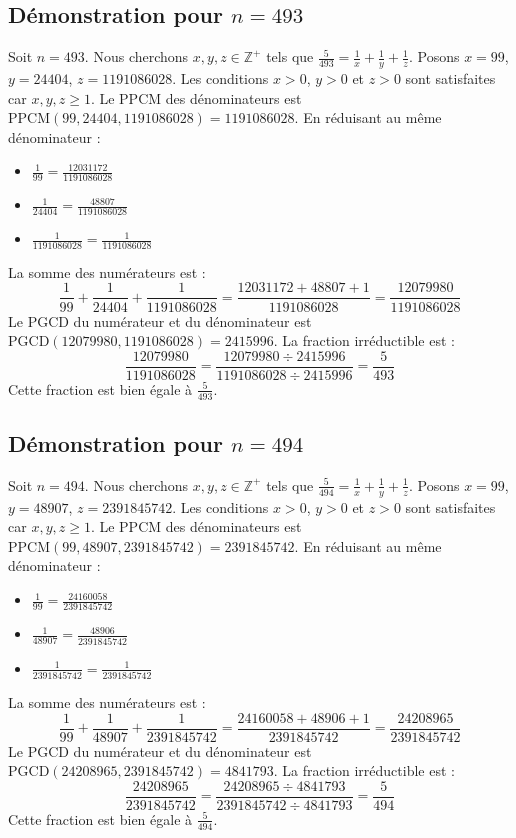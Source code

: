 \documentclass[11pt,a4paper]{article}
\begin{document}
\subsection{Démonstration pour $n = 493$}
Soit $n = 493$. Nous cherchons $x, y, z \in \mathbb{Z}^{+}$ tels que $\frac{5}{493} = \frac{1}{x} + \frac{1}{y} + \frac{1}{z}$.
Posons $x = 99$, $y = 24404$, $z = 1191086028$.
Les conditions $x > 0$, $y > 0$ et $z > 0$ sont satisfaites car $x, y, z \geq 1$.
Le PPCM des dénominateurs est $\text{PPCM}(99, 24404, 1191086028) = 1191086028$.
En réduisant au même dénominateur :
\begin{itemize}
    \item $\frac{1}{99} = \frac{12031172}{1191086028}$
    \item $\frac{1}{24404} = \frac{48807}{1191086028}$
    \item $\frac{1}{1191086028} = \frac{1}{1191086028}$
\end{itemize}
La somme des numérateurs est :
$$ \frac{1}{99} + \frac{1}{24404} + \frac{1}{1191086028} = \frac{12031172 + 48807 + 1}{1191086028} = \frac{12079980}{1191086028} $$
Le PGCD du numérateur et du dénominateur est $\text{PGCD}(12079980, 1191086028) = 2415996$.
La fraction irréductible est :
$$ \frac{12079980}{1191086028} = \frac{12079980 \div 2415996}{1191086028 \div 2415996} = \frac{5}{493} $$
Cette fraction est bien égale à $\frac{5}{493}$.

\subsection{Démonstration pour $n = 494$}
Soit $n = 494$. Nous cherchons $x, y, z \in \mathbb{Z}^{+}$ tels que $\frac{5}{494} = \frac{1}{x} + \frac{1}{y} + \frac{1}{z}$.
Posons $x = 99$, $y = 48907$, $z = 2391845742$.
Les conditions $x > 0$, $y > 0$ et $z > 0$ sont satisfaites car $x, y, z \geq 1$.
Le PPCM des dénominateurs est $\text{PPCM}(99, 48907, 2391845742) = 2391845742$.
En réduisant au même dénominateur :
\begin{itemize}
    \item $\frac{1}{99} = \frac{24160058}{2391845742}$
    \item $\frac{1}{48907} = \frac{48906}{2391845742}$
    \item $\frac{1}{2391845742} = \frac{1}{2391845742}$
\end{itemize}
La somme des numérateurs est :
$$ \frac{1}{99} + \frac{1}{48907} + \frac{1}{2391845742} = \frac{24160058 + 48906 + 1}{2391845742} = \frac{24208965}{2391845742} $$
Le PGCD du numérateur et du dénominateur est $\text{PGCD}(24208965, 2391845742) = 4841793$.
La fraction irréductible est :
$$ \frac{24208965}{2391845742} = \frac{24208965 \div 4841793}{2391845742 \div 4841793} = \frac{5}{494} $$
Cette fraction est bien égale à $\frac{5}{494}$.
\end{document}
